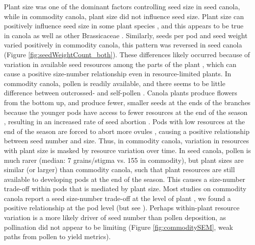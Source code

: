 \documentclass[12pt, draft]{article} %
\begin{document}
Plant size was one of the dominant factors controlling seed size in seed canola, while in commodity canola, plant size did not influence seed size.
Plant size can positively influence seed size in some plant species \citep{maddox1983}, and this appears to be true in canola \citep{riffkin2012} as well as other Brassicaceae \citep{mazer1987}.
Similarly, seeds per pod and seed weight varied positively in commodity canola, this pattern was reversed in seed canola (Figure \ref{fig:seedWeightCount_both}). 
These differences likely occurred because of variation in available seed resources among the parts of the plant \citep{vanNoordwijk1986}, which can cause a positive size-number relationship even in resource-limited plants. 
In commodity canola, pollen is readily available, and there seems to be little difference between outcrossed- and self-pollen \citep{steffan2003, rosa2011}. 
Canola plants produce flowers from the bottom up, and produce fewer, smaller seeds at the ends of the branches because the younger pods have access to fewer resources at the end of the season \citep{sabbahi2006}, resulting in an increased rate of seed abortion \citep{clarke1979}.
Pods with low resources at the end of the season are forced to abort more ovules \citep{wang2011}, causing a positive relationship between seed number and size.
Thus, in commodity canola, variation in resources with plant size is masked by resource variation over time.  
In seed canola, pollen is much rarer (median: 7 grains/stigma vs. 155 in commodity), but plant sizes are similar (or larger) than commodity canola, such that plant resources are still available to developing pods at the end of the season.
This causes a size-number trade-off within pods that is mediated by plant size.
Most studies on commodity canola report a seed size-number trade-off at the level of plant \citep{angadi2003,koltowski2005}, we found a positive relationship at the pod level (but see \citealp{sabbahi2005}).
Perhaps within-plant resource variation is a more likely driver of seed number than pollen deposition, as pollination did not appear to be limiting (Figure \ref{fig:commoditySEM}, weak paths from pollen to yield metrics).
\end{document}
